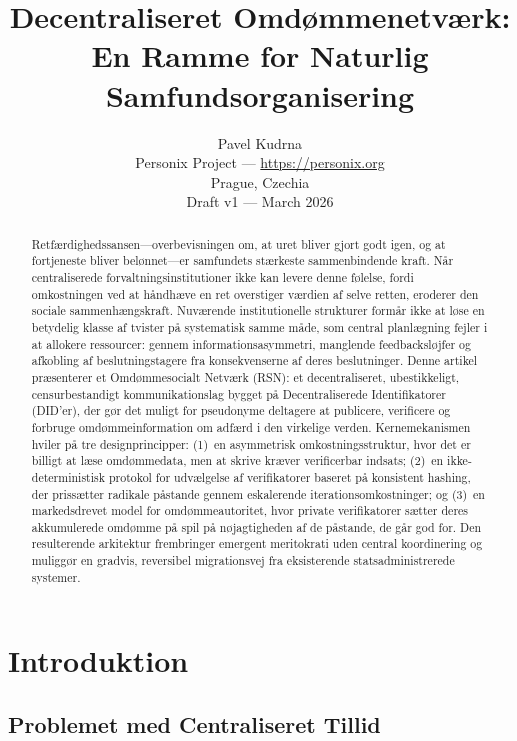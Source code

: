 \documentclass[11pt,a4paper,twocolumn]{article}
\title{\textbf{Decentraliseret Omdømmenetværk:\\En Ramme for Naturlig Samfundsorganisering}}
\author{Pavel Kudrna\\Personix Project --- \url{https://personix.org}\\Prague, Czechia\\Draft v1 --- March 2026}
\date{}
\begin{document}
\maketitle

\begin{abstract}
Retfærdighedssansen---overbevisningen om, at uret bliver gjort godt igen, og at fortjeneste bliver belønnet---er samfundets stærkeste sammenbindende kraft. Når centraliserede forvaltningsinstitutioner ikke kan levere denne følelse, fordi omkostningen ved at håndhæve en ret overstiger værdien af selve retten, eroderer den sociale sammenhængskraft. Nuværende institutionelle strukturer formår ikke at løse en betydelig klasse af tvister på systematisk samme måde, som central planlægning fejler i at allokere ressourcer: gennem informationsasymmetri, manglende feedbacksløjfer og afkobling af beslutningstagere fra konsekvenserne af deres beslutninger. Denne artikel præsenterer et Omdømmesocialt Netværk (RSN): et decentraliseret, ubestikkeligt, censurbestandigt kommunikationslag bygget på Decentraliserede Identifikatorer (DID'er), der gør det muligt for pseudonyme deltagere at publicere, verificere og forbruge omdømmeinformation om adfærd i den virkelige verden. Kernemekanismen hviler på tre designprincipper: (1)~en asymmetrisk omkostningsstruktur, hvor det er billigt at læse omdømmedata, men at skrive kræver verificerbar indsats; (2)~en ikke-deterministisk protokol for udvælgelse af verifikatorer baseret på konsistent hashing, der prissætter radikale påstande gennem eskalerende iterationsomkostninger; og (3)~en markedsdrevet model for omdømmeautoritet, hvor private verifikatorer sætter deres akkumulerede omdømme på spil på nøjagtigheden af de påstande, de går god for. Den resulterende arkitektur frembringer emergent meritokrati uden central koordinering og muliggør en gradvis, reversibel migrationsvej fra eksisterende statsadministrerede systemer.
\end{abstract}

\section{Introduktion}

\subsection{Problemet med Centraliseret Tillid}
\end{document}
